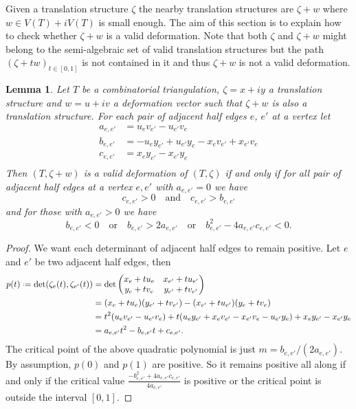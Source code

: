 \documentclass[a4paper,12pt]{article}
\newtheorem{lemma}[definition]{Lemma}
\newcommand*{\defeq}{\mathrel{\vcenter{\baselineskip0.5ex \lineskiplimit0pt
                     \hbox{\scriptsize.}\hbox{\scriptsize.}}}%
                     =}
\begin{document}
Given a translation structure $\zeta$ the nearby translation structures are $\zeta + w$
where $w \in V(T) + i V(T)$ is small enough. The aim of this section is to
explain how to check whether $\zeta + w$ is a valid deformation. Note
that both $\zeta$ and $\zeta + w$ might belong to the semi-algebraic set of valid
translation structures but the path $(\zeta + t w)_{t \in [0,1]}$ is not contained
in it and thus $\zeta + w$ is not a valid deformation.
\begin{lemma}
Let $T$ be a combinatorial triangulation, $\zeta = x + i y$ a
translation structure and $w = u + i v$ a deformation vector such
that $\zeta + w$ is also a translation structure. For each
pair of adjacent half edges $e$, $e'$ at a vertex let
\begin{align*}
a_{e,e'} &= u_e v_{e'} - u_{e'} v_e \\
b_{e,e'} &= -u_e y_{e'} + u_{e'} y_e - x_e v_{e'} + x_{e'} v_e \\
c_{e,e'} &= x_e y_{e'} - x_{e'} y_e \\
\end{align*}
    Then $(T, \zeta + w)$ is a valid deformation of $(T, \zeta)$ if and only if for all pair of adjacent half edges at a vertex $e, e'$ with $a_{e,e'} = 0$ we have 
\[
c_{e,e'} > 0
\quad \text{and} \quad
c_{e,e'} > b_{e,e'}
\]
and for those with $a_{e,e'} > 0$ we have
\[
b_{e,e'} < 0
\quad \text{or} \quad
b_{e,e'} > 2a_{e,e'}
\quad \text{or} \quad
b_{e,e'}^2 - 4 a_{e,e'} c_{e,e'} < 0.
\]
\end{lemma}

\begin{proof}
We want each determinant of adjacent half edges to remain positive. Let
$e$ and $e'$ be two adjacent half edges, then
\begin{align*}
p(t) \defeq \det(\zeta_{e}(t), \zeta_{e'}(t))
&= \det
\begin{pmatrix}
x_e + t u_e & x_{e'} + t u_{e'} \\
y_e + t v_e & y_{e'} + t v_{e'}
\end{pmatrix}
\\
&=  (x_e + t u_e)(y_{e'} + t v_{e'}) - (x_{e'} + t u_{e'})( y_e + t v_e) \\
&= t^2 (u_e v_{e'} - u_{e'} v_e) + t (u_e y_{e'} + x_e v_{e'} - x_{e'} v_e - u_{e'} y_e)
+ x_e y_{e'} - x_{e'} y_e \\
&= a_{e,e'}t^2 - b_{e,e'}t + c_{e,e'}.
\end{align*}
The critical point of the above quadratic polynomial is just $m = b_{e,e'} / (2 a_{e,e'})$.
By assumption, $p(0)$ and $p(1)$ are positive. So it remains positive all along if and
only if the critical value $\frac{-b_{e,e'}^2 + 4a_{e,e'}c_{e,e'}}{4 a_{e,e'}}$ is
positive or the critical point is outside the interval $[0,1]$.
\end{proof}
\end{document}
